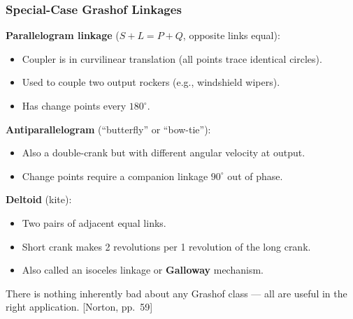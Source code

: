 \documentclass[10pt,aspectratio=43]{beamer}
\newcommand{\pref}[1]{\vfill\hfill{\scriptsize\color{gray}[Norton, pp.~#1]}}
\begin{document}
\begin{frame}
\frametitle{Special-Case Grashof Linkages}

\textbf{Parallelogram linkage} ($S + L = P + Q$, opposite links equal):
\begin{itemize}
  \item Coupler is in curvilinear translation (all points trace identical circles).
  \item Used to couple two output rockers (e.g., windshield wipers).
  \item Has change points every $180^\circ$.
\end{itemize}

\vspace{4pt}
\textbf{Antiparallelogram} (``butterfly'' or ``bow-tie''):
\begin{itemize}
  \item Also a double-crank but with different angular velocity at output.
  \item Change points require a companion linkage $90^\circ$ out of phase.
\end{itemize}

\vspace{4pt}
\textbf{Deltoid} (kite):
\begin{itemize}
  \item Two pairs of adjacent equal links.
  \item Short crank makes 2 revolutions per 1 revolution of the long crank.
  \item Also called an isoceles linkage or \textbf{Galloway} mechanism.
\end{itemize}

\vspace{4pt}
There is nothing inherently bad about any Grashof class --- all are useful in the right application.
\pref{59}
\end{frame}
\end{document}
